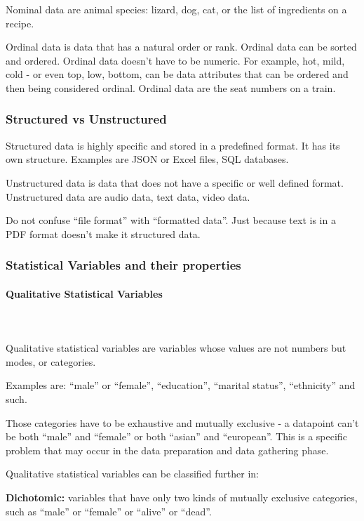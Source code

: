 \documentclass{article}
\begin{document}
Nominal data are animal species: lizard, dog, cat, or the list of ingredients on a recipe.

Ordinal data is data that has a natural order or rank. 
Ordinal data can be sorted and ordered. 
Ordinal data doesn’t have to be numeric. For example, hot, mild, cold - or even top, low, bottom, can be data attributes that can be ordered and then being considered ordinal. 
Ordinal data are the seat numbers on a train. 

\subsubsection{Structured vs Unstructured}
Structured data is highly specific and stored in a predefined format. It has its own structure.
Examples are JSON or Excel files, SQL databases. 

Unstructured data is data that does not have a specific or well defined format. 
Unstructured data are audio data, text data, video data. 

Do not confuse “file format” with “formatted data”. 
Just because text is in a PDF format doesn't make it structured data. 

\subsubsection{Statistical Variables and their properties}
\paragraph{Qualitative Statistical Variables}\mbox{} \\
\mbox{} \\

Qualitative statistical variables are variables whose values are not numbers but modes, or categories. 

Examples are: “male” or “female”, “education”, “marital status”, “ethnicity” and such.

Those categories have to be exhaustive and mutually exclusive - a datapoint can’t be both “male” and “female” or both “asian” and “european”. This is a specific problem that may occur in the data preparation and data gathering phase. 

Qualitative statistical variables can be classified further in:

\textbf{Dichotomic:} variables that have only two kinds of mutually exclusive categories,  such as “male” or “female” or “alive” or “dead”.
\end{document}
